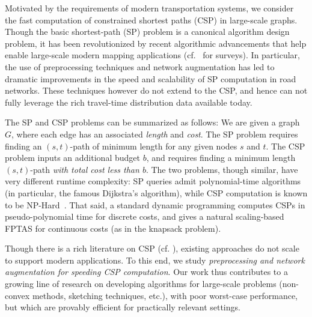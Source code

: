 Motivated by the requirements of modern transportation systems, we consider the fast computation of constrained shortest paths (CSP) in large-scale graphs. Though the basic shortest-path (SP) problem is a canonical algorithm design problem, it has been revolutionized by recent algorithmic advancements that help enable large-scale modern mapping applications (cf.~\cite{goldberg_survey,dimacs09} for surveys).
In particular, the use of preprocessing techniques and network augmentation has led to dramatic improvements in the speed and scalability of SP computation in road networks.
These techniques however do not extend to the CSP, and hence can not fully leverage the rich travel-time distribution data available today.

The SP and CSP problems can be summarized as follows: We are given a graph $G$, where each edge has an associated \emph{length} and \emph{cost}. 
The SP problem requires finding an $(s,t)$-path of minimum length for any given nodes $s$ and $t$. 
The CSP problem inputs an additional budget $b$, and requires finding a minimum length $(s,t)$-path \emph{with total cost less than $b$}.
The two problems, though similar, have very different runtime complexity: SP queries admit polynomial-time algorithms (in particular, the famous Dijkstra's algorithm), while CSP computation is known to be NP-Hard~\cite{csp_survey}.
That said, a standard dynamic programming computes CSPs in pseudo-polynomial time for discrete costs, and gives a natural scaling-based FPTAS for continuous costs (as in the knapsack problem).

Though there is a rich literature on CSP (cf. \cite{csp_survey}), existing approaches do not scale to support modern applications. 
To this end, we study \emph{preprocessing and network augmentation for speeding CSP computation}.
Our work thus contributes to a growing line of research on developing algorithms for large-scale problems (non-convex methods, sketching techniques, etc.), with poor worst-case performance, but which are provably efficient for practically relevant settings.


